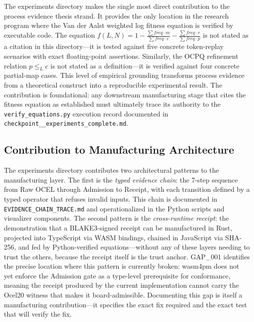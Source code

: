 The experiments directory makes the single most direct contribution to the process
evidence thesis strand. It provides the only location in the research program where
the Van der Aalst weighted log fitness equation is verified by executable code.
The equation $f(L,N) = 1 - \frac{\sum \mathit{freq} \cdot m}{\sum \mathit{freq} \cdot c} - \frac{\sum \mathit{freq} \cdot r}{\sum \mathit{freq} \cdot p}$
is not stated as a citation in this directory---it is tested against five concrete
token-replay scenarios with exact floating-point assertions. Similarly, the OCPQ
refinement relation $p \leq_L c$ is not stated as a definition---it is verified
against four concrete partial-map cases. This level of empirical grounding transforms
process evidence from a theoretical construct into a reproducible experimental result.
The contribution is foundational: any downstream manufacturing stage that cites
the fitness equation as established must ultimately trace its authority to the
\texttt{verify\_equations.py} execution record documented in
\texttt{checkpoint\_\_experiments\_complete.md}.

\subsection{Contribution to Manufacturing Architecture}
\label{sec:experiments-core-contribution-manufacturing}

The experiments directory contributes two architectural patterns to the manufacturing
layer. The first is the \emph{typed evidence chain}: the 7-step sequence from
Raw OCEL through Admission to Receipt, with each transition defined by a typed
operator that refuses invalid inputs. This chain is documented in
\texttt{EVIDENCE\_CHAIN\_TRACE.md} and operationalized in the Python scripts and
visualizer components. The second pattern is the \emph{cross-runtime receipt}:
the demonstration that a BLAKE3-signed receipt can be manufactured in Rust, projected
into TypeScript via WASM bindings, chained in JavaScript via SHA-256, and fed by
Python-verified equations---without any of these layers needing to trust the others,
because the receipt itself is the trust anchor. GAP\_001 identifies the precise
location where this pattern is currently broken: wasm4pm does not yet enforce the
Admission gate as a type-level prerequisite for conformance, meaning the receipt
produced by the current implementation cannot carry the Ocel20 witness that makes
it board-admissible. Documenting this gap is itself a manufacturing contribution---it
specifies the exact fix required and the exact test that will verify the fix.

